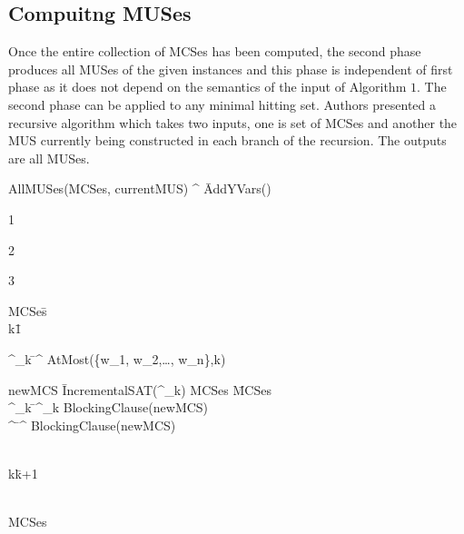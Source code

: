 \subsection{Compuitng MUSes}
Once the entire collection of MCSes has been computed, the second phase produces all MUSes of the given instances and this phase is independent of first phase as it does not depend on the semantics of the input of Algorithm $1$. The second phase can be applied to any minimal hitting set. Authors presented a recursive algorithm which takes two inputs, one is set of MCSes and another the MUS currently being constructed in each branch of the recursion. The outputs are all MUSes.\newline
\begin{Algorithm}
	\caption{Algorithm for computing the complete set of MUSes from a set of MCSes}
	\label{alg:allmuses}
	\begin{algorithm}{AllMUSes(MCSes, currentMUS)}
		\varphi^{\prime} \= AddYVars(\varphi) \\
		\begin{IF}{}
			1 \\
			\ELSE
			\begin{IF}{}
				2 \\
			\end{IF}
			\ELSE
			3 \\
		\end{IF}
		MCSes\=\emptyset \\
		k\=1 \\
		\begin{WHILE}{}
			\varphi^{\prime}_{k} \= \varphi^{\prime} \wedge AtMost(\{\neg w_{1}, \neg w_{2},\ldots, \neg w_{n}\},k) \\
			\begin{WHILE}{newMCS \= IncrementalSAT(\varphi^{\prime}_{k})}
				MCSes \= MCSes  \\
				\varphi^{\prime}_{k} \= \varphi^{\prime}_{k} \wedge BlockingClause(newMCS) \\
				\varphi^{\prime} \= \varphi^{\prime} \wedge BlockingClause(newMCS) \\
			\end{WHILE} \\
			k\=k+1 \\
		\end{WHILE} \\
		\RETURN MCSes
	\end{algorithm}
\end{Algorithm}
